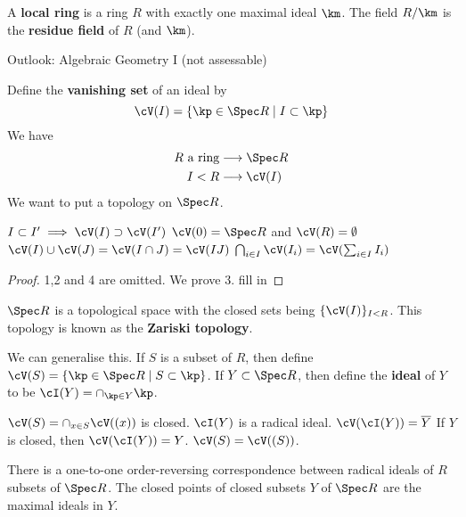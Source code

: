 \begin{defn}[0.20]
	A \textbf{local ring} is a ring $R$ with exactly one maximal ideal $\km$.
	The field $R/\km$ is the \textbf{residue field} of $R$ (and $\km$).
\end{defn}

Outlook: Algebraic Geometry I (not assessable)

Define the \textbf{vanishing set} of an ideal by
\[\cV(I) = \{\kp \in \Spec R \mid I \subset \kp\}\]
We have
\begin{align*}
	R \text{ a ring} &\longrightarrow \Spec R \\
	I<R &\longrightarrow \cV(I)
\end{align*}
We want to put a topology on $\Spec R$.

\begin{prop}[AG.1]
	\begin{enum}
		\io $I \subset I' \implies \cV(I) \supset \cV(I')$
		\io $\cV(0) = \Spec R$ and $\cV(R) = \emptyset$
		\io $\cV(I) \cup \cV(J) = \cV(I \cap J) = \cV(IJ)$
		\io $\bigcap_{i \in I} \cV(I_i) = \cV(\sum_{i \in I} I_i)$
	\end{enum}
\end{prop}

\begin{proof}
	1,2 and 4 are omitted.
	We prove 3.
	fill in
\end{proof}

\begin{thm}[AG.2]
	$\Spec R$ is a topological space with the closed sets being $\{\cV(I)\}_{I<R}$.
	This topology is known as the \textbf{Zariski topology}.
\end{thm}

We can generalise this.
If $S$ is a subset of $R$, then define $\cV(S) = \{\kp \in \Spec R \mid S \subset \kp\}$.
If $Y \subset \Spec R$, then define the \textbf{ideal} of $Y$ to be $\cI(Y) = \cap_{\kp \in Y} \kp$.

\begin{rmk}
	\begin{enum}
		\io $\cV(S) = \cap_{x \in S} \cV((x))$ is closed.
		\io $\cI(Y)$ is a radical ideal.
		\io $\cV(\cI(Y)) = \overline{Y}$
		\io If $Y$ is closed, then $\cV(\cI(Y))=Y$.
		\io $\cV(S) = \cV((S))$.
	\end{enum}
\end{rmk}

\begin{prop}[AG.3]
	\begin{enum}
		\io There is a one-to-one order-reversing correspondence between radical ideals of $R$ subsets of $\Spec R$.
		\io The closed points of closed subsets $Y$ of $\Spec R$ are the maximal ideals in $Y$.
	\end{enum}
\end{prop}

